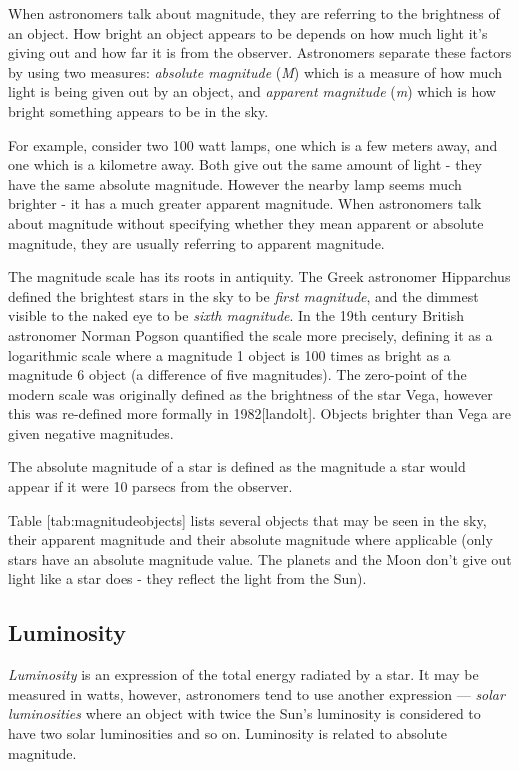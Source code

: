 When astronomers talk about magnitude, they are referring to the
brightness of an object. How bright an object appears to be depends on
how much light it's giving out and how far it is from the observer.
Astronomers separate these factors by using two measures: \emph{absolute
magnitude} (\emph{M}) which is a measure of how much light is being
given out by an object, and \emph{apparent magnitude} (\emph{m}) which
is how bright something appears to be in the sky.

For example, consider two 100 watt lamps, one which is a few meters
away, and one which is a kilometre away. Both give out the same amount
of light - they have the same absolute magnitude. However the nearby
lamp seems much brighter - it has a much greater apparent magnitude.
When astronomers talk about magnitude without specifying whether they
mean apparent or absolute magnitude, they are usually referring to
apparent magnitude.

The magnitude scale has its roots in antiquity. The Greek astronomer
Hipparchus defined the brightest stars in the sky to be \emph{first
magnitude}, and the dimmest visible to the naked eye to be \emph{sixth
magnitude}. In the 19th century British astronomer Norman Pogson
quantified the scale more precisely, defining it as a logarithmic scale
where a magnitude 1 object is 100 times as bright as a magnitude 6
object (a difference of five magnitudes). The zero-point of the modern
scale was originally defined as the brightness of the star Vega, however
this was re-defined more formally in 1982{[}landolt{]}. Objects brighter
than Vega are given negative magnitudes.

The absolute magnitude of a star is defined as the magnitude a star
would appear if it were 10 parsecs from the observer.

Table {[}tab:magnitudeobjects{]} lists several objects that may be seen
in the sky, their apparent magnitude and their absolute magnitude where
applicable (only stars have an absolute magnitude value. The planets and
the Moon don't give out light like a star does - they reflect the light
from the Sun).

\subsection{Luminosity}\label{luminosity}

\emph{Luminosity} is an expression of the total energy radiated by a
star. It may be measured in watts, however, astronomers tend to use
another expression --- \emph{solar luminosities} where an object with
twice the Sun's luminosity is considered to have two solar luminosities
and so on. Luminosity is related to absolute magnitude.

